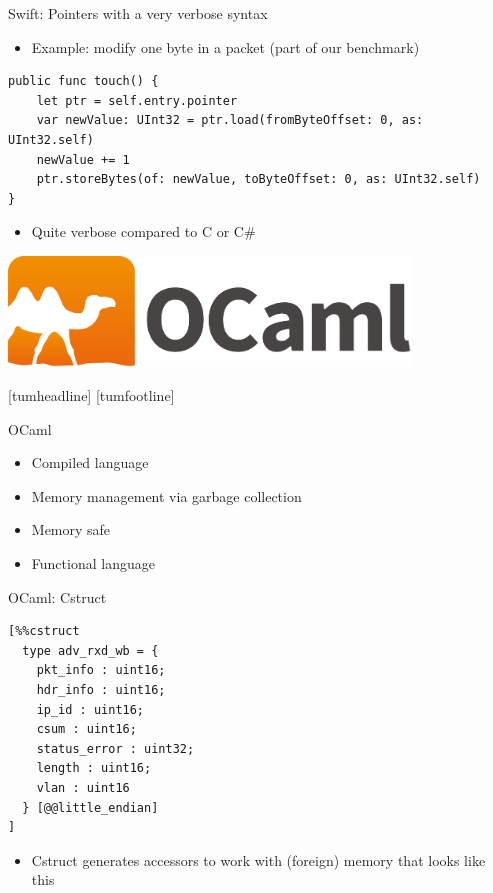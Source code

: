 \documentclass[NET,english,aspectratio=169,notitleframe]{tumbeamer}
\begin{document}
\begin{frame}[fragile]{Swift: Pointers with a very verbose syntax}
\begin{itemize}
\item Example: modify one byte in a packet (part of our benchmark)
\end{itemize}
\begin{verbatim}
public func touch() {
    let ptr = self.entry.pointer
    var newValue: UInt32 = ptr.load(fromByteOffset: 0, as: UInt32.self)
    newValue += 1
    ptr.storeBytes(of: newValue, toByteOffset: 0, as: UInt32.self)
}
\end{verbatim}
\begin{itemize}
\item Quite verbose compared to C or C\#
\end{itemize}
\end{frame}



\begin{frame}{}
\centering\includegraphics[width=0.8\textwidth]{pics/ocaml}
\end{frame}
[tumheadline]
[tumfootline]

\begin{frame}{OCaml}
\begin{itemize}
\item Compiled language
\item Memory management via garbage collection
\item Memory safe
\item Functional language
\end{itemize}
\end{frame}


\begin{frame}[fragile]{OCaml: Cstruct}
\begin{verbatim}
[%%cstruct
  type adv_rxd_wb = {
    pkt_info : uint16;
    hdr_info : uint16;
    ip_id : uint16;
    csum : uint16;
    status_error : uint32;
    length : uint16;
    vlan : uint16
  } [@@little_endian]
]
\end{verbatim}
\begin{itemize}
\item Cstruct generates accessors to work with (foreign) memory that looks like this
\end{itemize}
\end{frame}
\end{document}
